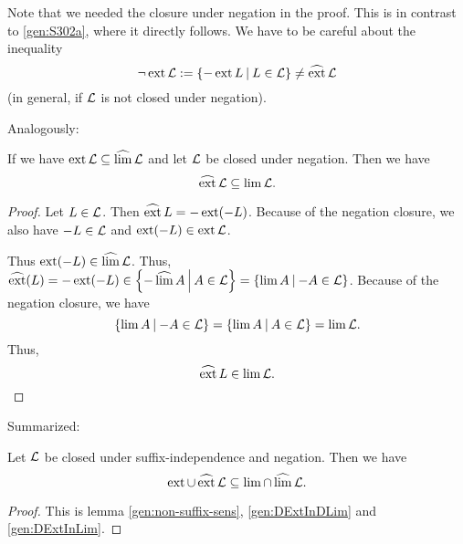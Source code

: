 Note that we needed the closure under negation in the proof. This is in contrast to \cref{gen:S302a}, where it directly follows. We have to be careful about the inequality
\[ \neg\ext \Lang := \Set{-\ext L}{L \in \Lang} \neq \dext \Lang \]
(in general, if $\mathcal{L}$ is not closed under negation).

Analogously:

\begin{lemma}
\label{gen:DExtInLim}
If we have $\operatorname{ext} \mathcal{L} \subseteq \operatorname{\widehat{lim}} \mathcal{L}$ and let $\mathcal{L}$ be closed under negation. Then we have
\[ \operatorname{\widehat{ext}} \mathcal{L} \subseteq \lim \mathcal{L} . \]
\begin{proof}
Let $L \in \mathcal{L}$. Then $ \operatorname{\widehat{ext}} L = - \operatorname{ext} (-L) $. Because of the negation closure, we also have $-L \in \mathcal{L}$ and $\operatorname{ext}(-L) \in \operatorname{ext} \mathcal{L}$.

Thus $\operatorname{ext}(-L) \in \operatorname{\widehat{lim}} \mathcal{L}$. Thus, $\dext(L) = -\ext(-L) \in \Set{-\dlim A}{A \in \Lang} = \Set{\lim A}{-A \in \Lang}$. Because of the negation closure, we have
\[ \Set{\lim A}{-A \in \Lang} = \Set{\lim A}{A \in \Lang} = \lim \Lang . \]
Thus,
\[ \operatorname{\widehat{ext}} L \in \lim \mathcal{L} . \]
\end{proof}
\end{lemma}

Summarized:

\begin{lemma}
\label{gen:extInLim}
Let $\mathcal{L}$ be closed under suffix-independence and negation. Then we have
\[ \operatorname{ext} \cup \operatorname{\widehat{ext}} \mathcal{L} \subseteq \lim \cap \operatorname{\widehat{lim}} \mathcal{L} . \]
\begin{proof}
This is lemma \ref{gen:non-suffix-sens}, \ref{gen:DExtInDLim} and \ref{gen:DExtInLim}.
\end{proof}
\end{lemma}

